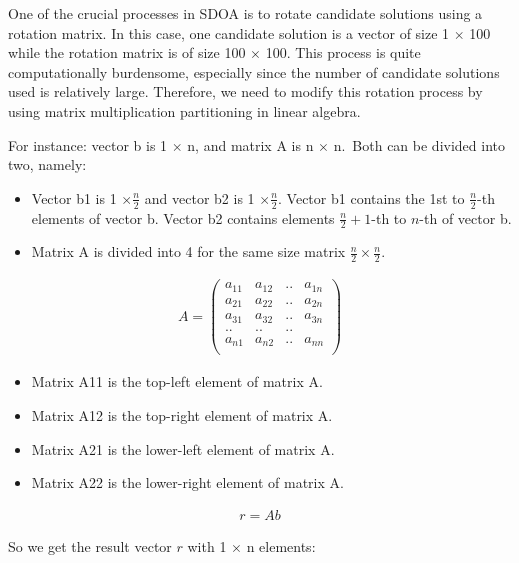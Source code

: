 \documentclass[preprint, 3p,
authoryear]{elsarticle} %
\providecommand{\tightlist}{%
  \setlength{\itemsep}{0pt}\setlength{\parskip}{0pt}}
\begin{document}
One of the crucial processes in SDOA is to rotate candidate solutions
using a rotation matrix. In this case, one candidate solution is a
vector of size 1 \(\times\) 100 while the rotation matrix is of size 100
\(\times\) 100. This process is quite computationally burdensome,
especially since the number of candidate solutions used is relatively
large. Therefore, we need to modify this rotation process by using
matrix multiplication partitioning in linear algebra.

For instance: vector b is 1 \(\times\) n, and matrix A is n \(\times\)
n.~Both can be divided into two, namely:

\begin{itemize}
\tightlist
\item
  Vector b1 is 1 \(\times \frac{n}{2}\) and vector b2 is 1
  \(\times \frac{n}{2}\). Vector b1 contains the 1st to
  \(\frac{n}{2}\)-th elements of vector b. Vector b2 contains elements
  \(\frac{n}{2} + 1\)-th to \(n\)-th of vector b.
\item
  Matrix A is divided into 4 for the same size matrix
  \(\frac{n}{2} \times \frac{n}{2}\).
\end{itemize}

\begin{align}
A = \begin{pmatrix}
a_{11} & a_{12} & .. & a_{1n} \\
a_{21} & a_{22} & .. & a_{2n} \\
a_{31} & a_{32} & .. & a_{3n} \\
.. & .. & .. \\
a_{n1} & a_{n2} & .. & a_{nn} \\
\end{pmatrix}
\end{align}

\begin{itemize}
\tightlist
\item
  Matrix A11 is the top-left element of matrix A.
\item
  Matrix A12 is the top-right element of matrix A.
\item
  Matrix A21 is the lower-left element of matrix A.
\item
  Matrix A22 is the lower-right element of matrix A.
\end{itemize}

\begin{align}
r = A b
\end{align}

So we get the result vector \(r\) with 1 \(\times\) n elements:
\end{document}
